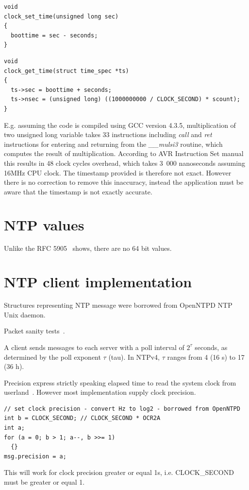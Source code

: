 \begin{lstlisting}
void
clock_set_time(unsigned long sec)
{
  boottime = sec - seconds;
}
\end{lstlisting}

\begin{lstlisting}
void
clock_get_time(struct time_spec *ts)
{
  ts->sec = boottime + seconds;
  ts->nsec = (unsigned long) ((1000000000 / CLOCK_SECOND) * scount);
}
\end{lstlisting}
E.g. assuming the code is compiled using GCC version 4.3.5,
multiplication of two unsigned long variable takes 33 instructions including {\it{call}} and {\it{ret}}
instructions for entering and returning from the {\it{\_\_mulsi3}} routine, which computes
the result of multiplication.
According to AVR Instruction Set manual~\cite{avr-instruction-set} this results in 48 clock cycles overhead,
which takes 3~000 nanoseconds assuming 16MHz CPU clock.
The timestamp provided is therefore not exact.
However there is no correction to remove this inaccuracy,
instead the application must be aware that the timestamp is not exactly accurate.


\section{NTP values}
Unlike the RFC 5905~\cite{rfc5905} shows, there are no 64 bit values. %


\section{NTP client implementation}
Structures representing NTP message were borrowed from OpenNTPD NTP Unix daemon.

Packet sanity tests~\cite{ntp-arch}.

A client sends messages to each server with a poll interval of $2^{\tau}$
seconds, as determined by the poll exponent $\tau$ (tau).
In NTPv4, $\tau$ ranges from 4 (16 s) to 17 (36 h).


Precision express strictly speaking elapsed time to read the system clock from userland~\cite{ntp-arch}.
However most implementation supply clock precision.
\begin{lstlisting}
// set clock precision - convert Hz to log2 - borrowed from OpenNTPD
int b = CLOCK_SECOND; // CLOCK_SECOND * OCR2A
int a;
for (a = 0; b > 1; a--, b >>= 1)
  {}
msg.precision = a;
\end{lstlisting}
This will work for clock precision greater or equal 1s, i.e. CLOCK\_SECOND must be greater or equal 1.

